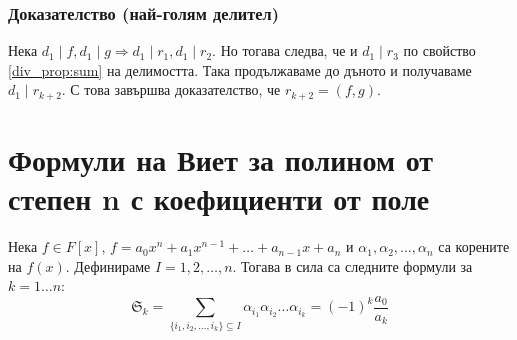 \documentclass[fleqn,12pt]{article}
\begin{document}
\subsubsection{Доказателство (най-голям делител)}
Нека $d_1 \mid f, d_1 \mid g \Rightarrow d_1 \mid r_1, d_1 \mid r_2$.
Но тогава следва, че и $d_1 \mid r_3$ по свойство \ref{div_prop:sum} на делимостта.
Така продължаваме до дъното и получаваме $d_1 \mid r_{k+2}$. С това завършва доказателство, че $r_{k+2} = (f,g)$.


\section{Формули на Виет за полином от степен n с коефициенти от поле}
Нека $f \in F[x]$, $f = a_0 x^n + a_1 x^{n-1} + \dots + a_{n-1} x + a_n$
и $\alpha_1, \alpha_2, \dots, \alpha_n$ са корените на $f(x)$. Дефинираме $I = {1, 2, \dots, n}$. 
Тогава в сила са следните формули за $k=1\dots n$:
\[ \mathfrak{S}_k = \sum_{\{i_1, i_2, \dots, i_k \} \subseteq I} \alpha_{i_1} \alpha_{i_2} \dots \alpha_{i_k} = (-1)^k \frac{a_0}{a_k} \]
\end{document}
